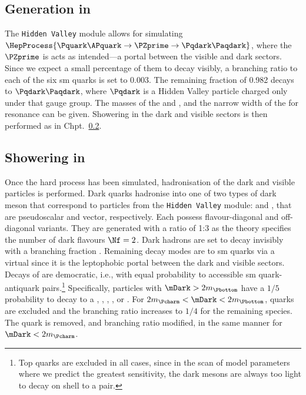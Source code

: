

\subsection{Generation in \texorpdfstring{\PYTHIA}{Pythia}}
\label{subsec:svj_signal_pythia}

The \texttt{Hidden Valley} module allows for simulating $\HepProcess{\Pquark\APquark \to \PZprime \to \Pqdark\Paqdark}$, where the $\PZprime$ is acts as intended---a portal between the visible and dark sectors. Since we expect a small percentage of them to decay visibly, a branching ratio to each of the six \acrshort{sm} quarks is set to 0.003. The remaining fraction of 0.982 decays to $\Pqdark\Paqdark$, where $\Pqdark$ is a Hidden Valley particle charged only under that gauge group. The masses of the \PZprime and \Pqdark, and the narrow width of the \PZprime for resonance can be given. Showering in the dark and visible sectors is then performed as in Chpt.~\ref{subsec:svj_showering_pythia}.




\subsection{Showering in \texorpdfstring{\PYTHIA}{Pythia}}
\label{subsec:svj_showering_pythia}


Once the hard process has been simulated, hadronisation of the dark and visible particles is performed. Dark quarks hadronise into one of two types of dark meson that correspond to particles from the \texttt{Hidden Valley} module: \Ppidark and \Prhodark, that are pseudoscalar and vector, respectively. Each possess flavour-diagonal and off-diagonal variants. They are generated with a ratio of 1:3 as the theory specifies the number of dark flavours $\Nf = \text{2}$. Dark hadrons are set to decay invisibly with a branching fraction \rinv. Remaining decay modes are to \acrshort{sm} quarks via a virtual \PZprime since it is the leptophobic portal between the dark and visible sectors. Decays of \Prhodark are democratic, i.e., with equal probability to accessible \acrshort{sm} quark-antiquark pairs.\footnote{Top quarks are excluded in all cases, since in the scan of model parameters where we predict the greatest sensitivity, the dark mesons are always too light to decay on shell to a \ttbar pair.} Specifically, \Prhodark particles with $\mDark > \text{2}m_{\Pbottom}$ have a $\text{1}/\text{5}$ probability to decay to a \Pup, \Pdown, \Pcharm, \Pstrange, or \Pbottom. For $2m_{\Pcharm} < \mDark < 2m_{\Pbottom}$, \Pbottom quarks are excluded and the branching ratio increases to $\text{1}/\text{4}$ for the remaining species. The \Pcharm quark is removed, and branching ratio modified, in the same manner for $\mDark < 2m_{\Pcharm}$.

